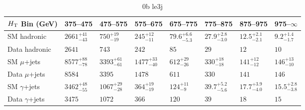 \documentclass[8pt]{article}
\def\scalht{\mbox{$H_{\rm{T}}$}\xspace}
\newcommand\T{\rule{0pt}{2.6ex}}
\newcommand\B{\rule[-1.2ex]{0pt}{0pt}}
\begin{document}
\begin{table}[ht!]
\caption{0b le3j}
\label{tab:ensemble-0b le3j}
\centering
\begin{tabular}{ llllllll }

\hline
\scalht Bin (GeV)       & 375--475                       & 475--575                       & 575--675                       & 675--775                       & 775--875                       & 875--975                       & 975--$\infty$                  \\ [1.000000ex]
\hline
SM hadronic\T           & $2661^{+41}_{-43}$             & $750^{+19}_{-19}$              & $245^{+12}_{-11}$              & $79.6^{+6.6}_{-5.3}$           & $27.9^{+2.8}_{-3.0}$           & $12.5^{+2.1}_{-2.1}$           & $9.2^{+1.4}_{-1.7}$            \\ 
Data hadronic\B         & $2641$                         & $743$                          & $242$                          & $85$                           & $29$                           & $12$                           & $10$                           \\ 
\hline
SM $\mu$+jets\T         & $8577^{+88}_{-78}$             & $3393^{+61}_{-61}$             & $1477^{+33}_{-40}$             & $612^{+29}_{-26}$              & $330^{+18}_{-18}$              & $141^{+12}_{-12}$              & $146^{+13}_{-10}$              \\ 
Data $\mu$+jets\B       & $8584$                         & $3395$                         & $1478$                         & $611$                          & $330$                          & $141$                          & $146$                          \\ 
\hline
SM $\gamma$+jets\T      & $3462^{+48}_{-55}$             & $1067^{+29}_{-28}$             & $364^{+19}_{-19}$              & $124^{+11}_{-9}$               & $39.7^{+5.2}_{-5.6}$           & $17.7^{+3.9}_{-4.0}$           & $15.5^{+2.8}_{-3.8}$           \\ 
Data $\gamma$+jets\B    & $3475$                         & $1072$                         & $366$                          & $120$                          & $39$                           & $18$                           & $15$                           \\ 
\hline

\end{tabular}
\end{table}
\end{document}
